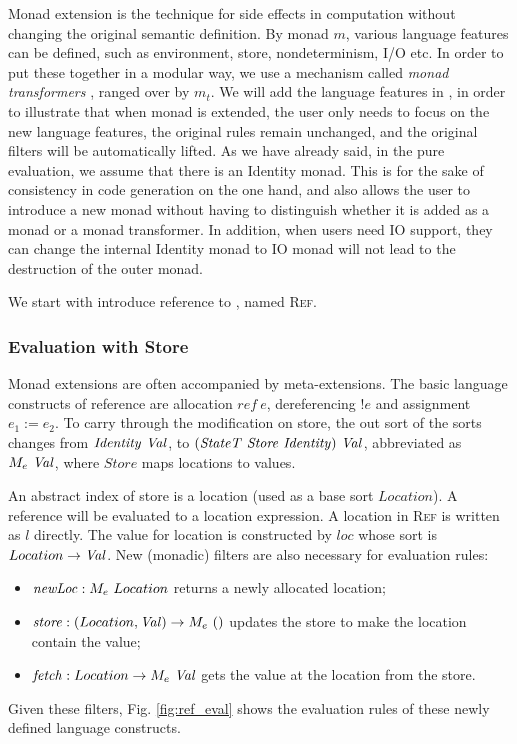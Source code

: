 Monad extension \cite{monad-1,monad-2} is the technique for side effects in computation without changing the original semantic definition.
By monad $m$, various language features can be defined, such as environment, store, nondeterminism, I/O etc.
In order to put these together in a modular way, we use a mechanism called \textit{monad transformers} \cite{monad-tr}, ranged over by $m_t$.
We will add the language features in \STLC,
 in order to illustrate that when monad is extended,
  the user only needs to focus on the new language features,
  the original rules remain unchanged,
  and the original filters will be automatically lifted.
As we have already said,
 in the pure evaluation,
 we assume that there is an Identity monad.
This is for the sake of consistency in code generation on the one hand,
 and also allows the user to introduce a new monad without having to distinguish whether it is added as a monad or a monad transformer.
In addition, when users need IO support, they can change the internal Identity monad to IO monad will not lead to the destruction of the outer monad.

We start with introduce reference to \STLC, named \textsc{Ref}.

\subsubsection{Evaluation with Store}

Monad extensions are often accompanied by meta-extensions.
The basic language constructs of reference are allocation $ref~e$, dereferencing $!e$ and assignment $e_1:=e_2$.
To carry through the modification on store, 
 the out sort of the sorts changes from $\mathit{Identity}~\mathit{Val}$,
 to $(\mathit{StateT~Store~Identity})~\mathit{Val}$, abbreviated as $M_e~\mathit{Val}$,
 where $\mathit{Store}$ maps locations to values.

An abstract index of store is a location (used as a base sort $Location$).
A reference will be evaluated to a location expression.
A location in \textsc{Ref} is written as $l$ directly.
The value for location is constructed by $loc$ whose sort is $Location->\mathit{Val}$.
New (monadic) filters are also necessary for evaluation rules:
\begin{itemize}
  \item $\mathit{newLoc}:M_e~Location$ returns a newly allocated location;
  \item $\mathit{store}:(Location,\mathit{Val})->M_e~()$ updates the store to make the location contain the value;
  \item $\mathit{fetch}:Location->M_e~\mathit{Val}$ gets the value at the location from the store.
\end{itemize}
Given these filters, Fig. \ref{fig:ref_eval} shows the evaluation rules of these newly defined language constructs.

